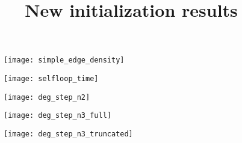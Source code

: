 \documentclass[11pt]{article}
\begin{document}
\title{\vspace{-20mm}New initialization results}
\author{}
\date{}
\maketitle

\centering
\begin{figure}[h!]
  \vspace{-15mm}
  \texttt{[image: simple\_edge\_density]}
\end{figure}

\begin{figure}[h!]
  \vspace{-15mm}
  \texttt{[image: selfloop\_time]}
\end{figure}



\centering
\begin{figure}[h!]
  \texttt{[image: deg\_step\_n2]}
\end{figure}

\clearpage

\centering
\begin{figure}[h!]
  \vspace{-5mm}
  \texttt{[image: deg\_step\_n3\_full]}
\end{figure}

\centering
\begin{figure}[h!]
  \vspace{-5mm}
  \texttt{[image: deg\_step\_n3\_truncated]}
\end{figure}
\end{document}
